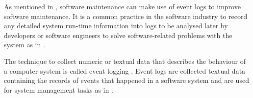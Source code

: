 As mentioned in , software maintenance can make use of event logs to improve software maintenance. It is a common practice in the software industry to record any detailed system run-time information into logs to be analysed later by developers or software engineers to solve software-related problems with the system as in  \cite{Zhu2019}.\par The technique to collect numeric or textual data that describes the behaviour of a computer system is called event logging \cite{Pecchia2015, Baccanico2014}. Event logs are collected textual data containing the records of events that happened in a software system and are used for system management tasks as in  \cite{Rong2018a, Rong2018, Baccanico2014}.

